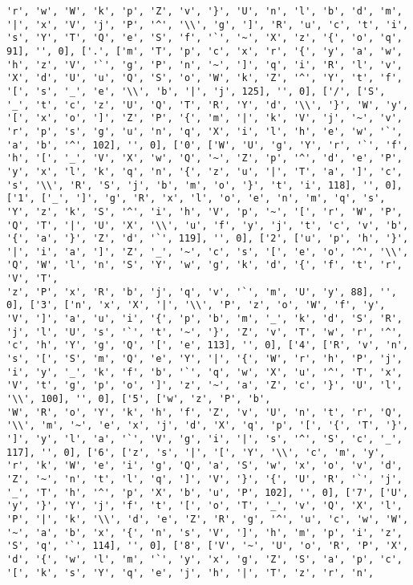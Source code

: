\documentclass{article}
\begin{document}
\begin{verbatim}
'r', 'w', 'W', 'k', 'p', 'Z', 'v', '}', 'U', 'n', 'l', 'b', 'd', 'm', '|', 'x', 'V', 'j', 'P', '^', '\\', 'g', ']', 'R', 'u', 'c', 't', 'i', 's', 'Y', 'T', 'Q', 'e', 'S', 'f', '`', '~', 'X', 'z', '{', 'o', 'q', 91], '', 0], ['.', ['m', 'T', 'p', 'c', 'x', 'r', '{', 'y', 'a', 'w', 'h', 'z', 'V', '`', 'g', 'P', 'n', '~', ']', 'q', 'i', 'R', 'l', 'v', 'X', 'd', 'U', 'u', 'Q', 'S', 'o', 'W', 'k', 'Z', '^', 'Y', 't', 'f', '[', 's', '_', 'e', '\\', 'b', '|', 'j', 125], '', 0], ['/', ['S', '_', 't', 'c', 'z', 'U', 'Q', 'T', 'R', 'Y', 'd', '\\', '}', 'W', 'y', '[', 'x', 'o', ']', 'Z', 'P', '{', 'm', '|', 'k', 'V', 'j', '~', 'v', 'r', 'p', 's', 'g', 'u', 'n', 'q', 'X', 'i', 'l', 'h', 'e', 'w', '`', 'a', 'b', '^', 102], '', 0], ['0', ['W', 'U', 'g', 'Y', 'r', '`', 'f', 'h', '[', '_', 'V', 'X', 'w', 'Q', '~', 'Z', 'p', '^', 'd', 'e', 'P', 'y', 'x', 'l', 'k', 'q', 'n', '{', 'z', 'u', '|', 'T', 'a', ']', 'c', 's', '\\', 'R', 'S', 'j', 'b', 'm', 'o', '}', 't', 'i', 118], '', 0], ['1', ['_', ']', 'g', 'R', 'x', 'l', 'o', 'e', 'n', 'm', 'q', 's', 'Y', 'z', 'k', 'S', '^', 'i', 'h', 'V', 'p', '~', '[', 'r', 'W', 'P', 'Q', 'T', '|', 'U', 'X', '\\', 'u', 'f', 'y', 'j', 't', 'c', 'v', 'b', '{', 'a', '}', 'Z', 'd', '`', 119], '', 0], ['2', ['u', 'p', 'h', '}', '|', 'i', 'a', ']', 'Z', '_', '~', 'c', 's', '[', 'e', 'o', '^', '\\', 'Q', 'W', 'l', 'n', 'S', 'Y', 'w', 'g', 'k', 'd', '{', 'f', 't', 'r', 'V', 'T', 
'z', 'P', 'x', 'R', 'b', 'j', 'q', 'v', '`', 'm', 'U', 'y', 88], '', 0], ['3', ['n', 'x', 'X', '|', '\\', 'P', 'z', 'o', 'W', 'f', 'y', 'V', ']', 'a', 'u', 'i', '{', 'p', 'b', 'm', '_', 'k', 'd', 'S', 'R', 'j', 'l', 'U', 's', '`', 't', '~', '}', 'Z', 'v', 'T', 'w', 'r', '^', 'c', 'h', 'Y', 'g', 'Q', '[', 'e', 113], '', 0], ['4', ['R', 'v', 'n', 's', '[', 'S', 'm', 'Q', 'e', 'Y', '|', '{', 'W', 'r', 'h', 'P', 'j', 'i', 'y', '_', 'k', 'f', 'b', '`', 'q', 'w', 'X', 'u', '^', 'T', 'x', 'V', 't', 'g', 'p', 'o', ']', 'z', '~', 'a', 'Z', 'c', '}', 'U', 'l', '\\', 100], '', 0], ['5', ['w', 'z', 'P', 'b', 
'W', 'R', 'o', 'Y', 'k', 'h', 'f', 'Z', 'v', 'U', 'n', 't', 'r', 'Q', '\\', 'm', '~', 'e', 'x', 'j', 'd', 'X', 'q', 'p', '[', '{', 'T', '}', ']', 'y', 'l', 'a', '`', 'V', 'g', 'i', '|', 's', '^', 'S', 'c', '_', 117], '', 0], ['6', ['z', 's', '|', '[', 'Y', '\\', 'c', 'm', 'y', 'r', 'k', 'W', 'e', 'i', 'g', 'Q', 'a', 'S', 'w', 'x', 'o', 'v', 'd', 'Z', '~', 'n', 't', 'l', 'q', ']', 'V', '}', '{', 'U', 'R', '`', 'j', '_', 'T', 'h', '^', 'p', 'X', 'b', 'u', 'P', 102], '', 0], ['7', ['U', 'y', '}', 'Y', 'j', 'f', 't', '[', 'o', 'T', '_', 'v', 'Q', 'X', 'l', 'P', '|', 'k', '\\', 'd', 'e', 'Z', 'R', 'g', '^', 'u', 'c', 'w', 'W', '~', 'a', 'b', 'x', '{', 'n', 's', 'V', ']', 'h', 'm', 'p', 'i', 'z', 'S', 'q', '`', 114], '', 0], ['8', ['V', '~', 'U', 'o', 'R', 'P', 'X', 'd', '{', 'w', 'l', 'm', '`', 'y', 'x', 'g', 'Z', 'S', 'a', 'p', 'c', '[', 'k', 's', 'Y', 'q', 'e', 'j', 'h', '|', 'T', 'z', 'r', 'n', 

\end{verbatim}
\end{document}
